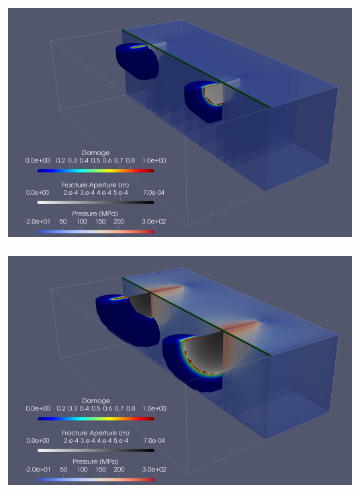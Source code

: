 \begin{figure}[h]
\begin{subfigure}{.45\textwidth}
  \centering
  \includegraphics[width=\linewidth]{Chapter4/figures/3D/new_t_0.png}
  \caption{}
  \label{fig:parallel_t_0}
\end{subfigure}%
\hspace{1cm}
\begin{subfigure}{.45\textwidth}
  \centering
  \includegraphics[width=\linewidth]{Chapter4/figures/3D/new_t_30.png}
  \caption{}
  \label{fig:parallel_t_1}
\end{subfigure}%


\end{figure}
